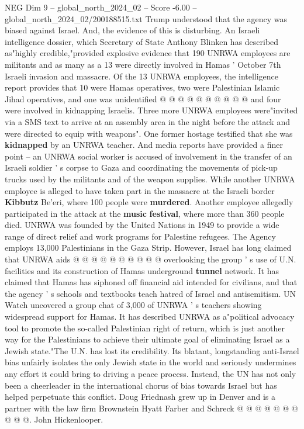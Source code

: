 \begin{textsample}{NEG Dim 9 – global\_north\_2024\_02 – Score -6.00 – global\_north\_2024\_02/200188515.txt}
Trump understood that the agency was biased against Israel.
And, the evidence of this is disturbing.
An Israeli intelligence dossier, which Secretary of State Anthony Blinken has described as"highly credible,"provided explosive evidence that 190 UNRWA employees are militants and as many as a 13 were directly involved in Hamas ' October 7th Israeli invasion and massacre.
Of the 13 UNRWA employees, the intelligence report provides that 10 were Hamas operatives, two were Palestinian Islamic Jihad operatives, and one was unidentified @ @ @ @ @ @ @ @ @ @ and four were involved in kidnapping Israelis.
Three more UNRWA employees were"invited via a SMS text to arrive at an assembly area in the night before the attack and were directed to equip with weapons".
One former hostage testified that she was \textbf{kidnapped} by an UNRWA teacher.
And media reports have provided a finer point -- an UNRWA social worker is accused of involvement in the transfer of an Israeli soldier ' s corpse to Gaza and coordinating the movements of pick-up trucks used by the militants and of the weapon supplies.
While another UNRWA employee is alleged to have taken part in the massacre at the Israeli border \textbf{Kibbutz} Be'eri, where 100 people were \textbf{murdered}.
Another employee allegedly participated in the attack at the \textbf{music} \textbf{festival}, where more than 360 people died.
UNRWA was founded by the United Nations in 1949 to provide a wide range of direct relief and work programs for Palestine refugees.
The Agency employs 13,000 Palestinians in the Gaza Strip.
However, Israel has long claimed that UNRWA aids @ @ @ @ @ @ @ @ @ @ overlooking the group ' s use of U.N. facilities and its construction of Hamas underground \textbf{tunnel} network.
It has claimed that Hamas has siphoned off financial aid intended for civilians, and that the agency ' s schools and textbooks teach hatred of Israel and antisemitism.
UN Watch uncovered a group chat of 3,000 of UNRWA ' s teachers showing widespread support for Hamas.
It has described UNRWA as a"political advocacy tool to promote the so-called Palestinian right of return, which is just another way for the Palestinians to achieve their ultimate goal of eliminating Israel as a Jewish state."The U.N. has lost its credibility.
Its blatant, longstanding anti-Israel bias unfairly isolates the only Jewish state in the world and seriously undermines any effort it could bring to driving a peace process.
Instead, the UN has not only been a cheerleader in the international chorus of bias towards Israel but has helped perpetuate this conflict.
Doug Friednash grew up in Denver and is a partner with the law firm Brownstein Hyatt Farber and Schreck @ @ @ @ @ @ @ @ @ @.
John Hickenlooper.

\end{textsample}
